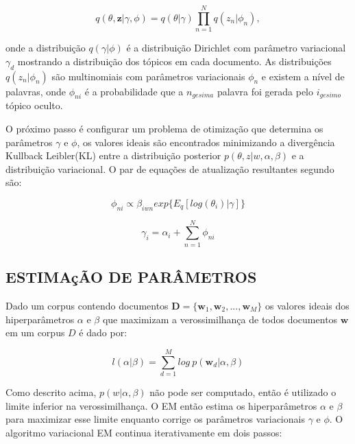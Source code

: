 \documentclass[12pt,a4paper]{article}
\begin{document}
  \begin{equation}
  q(\theta,\textbf{z}|\gamma,\phi)=q(\theta|\gamma)\prod_{n=1}^{N}q(z_n|\phi_n), 
  \end{equation}
  
  onde a distribuição  $q(\gamma|\phi)$ é a distribuição Dirichlet com parâmetro variacional $\gamma_d$ mostrando a distribuição dos tópicos em cada documento. As distribuições $q(z_n | \phi_n)$ são multinomiais com parâmetros variacionais $\phi_n$ e existem a nível de palavras, onde $\phi_{ni}$ é a probabilidade que a $n_{gesima}$ palavra foi gerada pelo $i_{gesimo}$ tópico oculto.
  
  O próximo passo é configurar um problema de otimização que determina os parâmetros $\gamma$ e $\phi$, os valores ideais são encontrados minimizando a divergência Kullback Leibler(KL) entre a distribuição posterior $p(\theta, z|w,\alpha,\beta)$ e a distribuição variacional. O par de equações de atualização resultantes segundo  são:
  
  \begin{equation}
  \phi_{ni} \propto \beta_{iwn} exp\{E_q[log(\theta_i)|\gamma]\}
  \end{equation}
  
  \begin{equation}
  \gamma_i = \alpha_i + \sum_{n=1}^{N} \phi_{ni}
  \end{equation}
  
  
  \subsection{ESTIMAçÃO DE PARÂMETROS}
  Dado um corpus contendo documentos $\textbf{D} = \{\textbf{w}_1, \textbf{w}_2, . . ., \textbf{w}_M\}$ os valores ideais dos hiperparâmetros $\alpha$ e $\beta$ que maximizam a verossimilhança de todos documentos $\textbf{w}$ em um corpus $D$ é dado por:
  
  \begin{equation}
  l(\alpha|\beta) = \sum_{d=1}^{M} log\ p(\textbf{w}_d|\alpha,\beta)
  \end{equation}
  
  Como descrito acima, $p(w|\alpha,\beta)$ não pode ser computado, então é utilizado o limite inferior na verossimilhança. O EM então estima os hiperparâmetros $\alpha$ e $\beta$ para maximizar esse limite enquanto corrige os parâmetros variacionais $\gamma$ e $\phi$. O algoritmo variacional EM continua iterativamente em dois passos:
  
\end{document}
